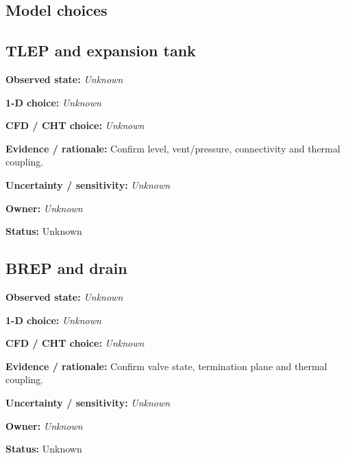 \documentclass[11pt]{article}
\begin{document}
\subsection{Model choices}
\par\noindent\begin{minipage}{\textwidth}\small\setlength{\parskip}{2pt}
\subsection*{TLEP and expansion tank}
\textbf{Observed state:} \textit{Unknown}\par
\textbf{1-D choice:} \textit{Unknown}\par
\textbf{CFD / CHT choice:} \textit{Unknown}\par
\textbf{Evidence / rationale:} Confirm level, vent/pressure, connectivity and thermal coupling.\par
\textbf{Uncertainty / sensitivity:} \textit{Unknown}\par
\textbf{Owner:} \textit{Unknown}\par
\textbf{Status:} Unknown\par
\end{minipage}\par\vspace{5pt}
\par\noindent\begin{minipage}{\textwidth}\small\setlength{\parskip}{2pt}
\subsection*{BREP and drain}
\textbf{Observed state:} \textit{Unknown}\par
\textbf{1-D choice:} \textit{Unknown}\par
\textbf{CFD / CHT choice:} \textit{Unknown}\par
\textbf{Evidence / rationale:} Confirm valve state, termination plane and thermal coupling.\par
\textbf{Uncertainty / sensitivity:} \textit{Unknown}\par
\textbf{Owner:} \textit{Unknown}\par
\textbf{Status:} Unknown\par
\end{minipage}\par\vspace{5pt}
\end{document}
